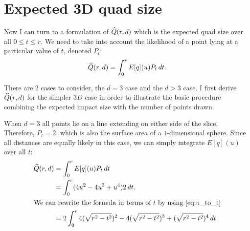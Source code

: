 \section{Expected 3D quad size}

Now I can turn to a formulation of $\widehat{Q}(r,d)$ which is the expected quad
size over all $0 \le t \le r$.  We need to take into account the
likelihood of a point lying at a particular value of $t$, 
denoted $P_t$:
\begin{align*}
  \widehat{Q}(r,d) = \int_0^r E[q](u) P_t \, dt
  \text{.}
\end{align*}

There are 2 cases to consider, the $d=3$ case and the $d>3$ case.
I first derive $\widehat{Q}(r,d)$ for the simpler $3D$ case in order to illustrate
the basic procedure combining the expected impact size with the number of
points drawn.

When $d=3$ all points lie on a line extending on either side of the slice.
Therefore, $P_t = 2$, which is also the surface area of a $1$-dimensional
sphere.
Since all distances are equally likely in this case, we can simply integrate
$E[q](u)$ over all $t$:
\begin{align*}
\expfrags 
     &= \int_{0}^r E[q] (u) P_t \, dt \\
     &= \int_{0}^r (4u^2 - 4u^3 + u^4) 2 \, dt \text{.}\\
\intertext{We can rewrite the formula in terms of $t$ by using \autoref{eq:u_to_t}}
     &= 2 \int_{0}^r 
          4(\sqrt{r^2-t^2})^2 - 4(\sqrt{r^2-t^2})^3 + (\sqrt{r^2-t^2})^4 \, dt
          \text{.}
\end{align*}

